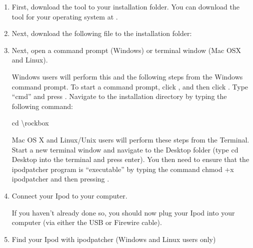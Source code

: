 \begin{enumerate} 

  \item First, download the  tool to your installation 
  folder.  You can download the  tool for your operating
  system at .
  
  \item Next, download the following file to the installation folder: 


  \item Next, open a command prompt (Windows) or terminal window (Mac OSX and Linux).
  
    Windows users will perform this and the following steps from the Windows 
    command prompt.  To start a command prompt, click , and then 
    click .  Type ``cmd'' and press .  Navigate 
    to the installation directory by typing the following command:

    \begin{code} 
        cd \textbackslash{}rockbox
      \end{code}
      
    Mac OS X and Linux/Unix users will perform these steps from the Terminal. 
    Start a new terminal window and navigate to the Desktop folder (type cd 
    Desktop into the terminal and press enter). You then need to ensure that the 
    ipodpatcher program is ``executable'' by typing the command chmod +x 
    ipodpatcher and then pressing .
  
  \item Connect your Ipod to your computer.

    If you haven't already done so, you should now plug your Ipod into your
    computer (via either the USB or Firewire cable).


  \item Find your Ipod with ipodpatcher (Windows and Linux users only)


\end{enumerate}
